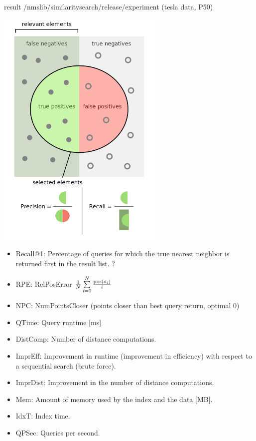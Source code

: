 \documentclass[xcolor=dvipsnames, aspectratio=1610]{beamer}
\begin{document}
\begin{frame}[fragile]{result /nmslib/similarity\textunderscore search/release/experiment (tesla data, P50)}
{\begin{minipage}{0.99\textwidth}
{}
\end{minipage}
\fboxsep=15pt 
\begin{minipage}{0.45\textwidth} 
\includegraphics[width=0.6\textwidth]{Figures/Precisionrecall.png}
\end{minipage}  
\begin{minipage}{0.45\textwidth} 
\begin{itemize}
\item Recall@1: Percentage of queries for which the true nearest neighbor is returned first in the result list. ?
\item RPE: RelPosError $\frac{1}{N} \sum\limits^N_{i=1} \frac{{\rm pos} \left( o_i \right)}{i}  $ 
\item NPC: NumPointsCloser (points closer than best query return, optimal 0)
\item QTime: Query runtime [ms] 
\item DistComp: Number of distance computations.
\item ImprEff:  Improvement in runtime (improvement in efficiency) with respect to a sequential search (brute force).
\item ImprDist:  Improvement in the number of distance computations.
\item Mem:  Amount of memory used by the index and the data [MB].
\item IdxT: Index time. 
\item QPSec: Queries per second.
\end{itemize}
\end{minipage} }
\end{frame}
\end{document}
